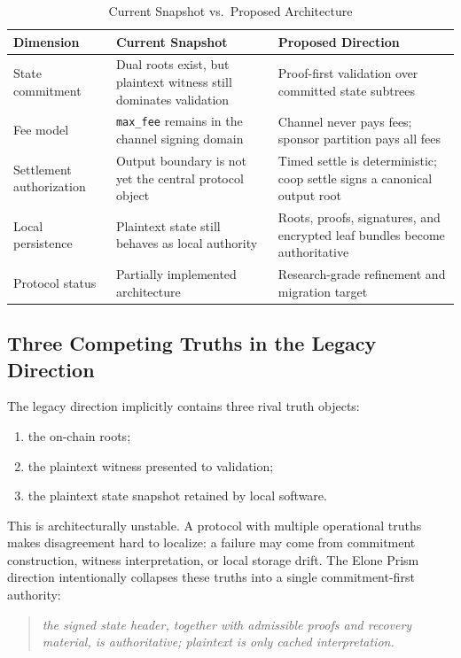 \documentclass[11pt,a4paper]{article}
\newcommand{\code}[1]{\texttt{#1}}
\begin{document}
\begin{table}[htbp]
\centering
\caption{Current Snapshot vs.\ Proposed Architecture}
\label{tab:current_vs_proposed}
\small
\begin{tabularx}{\linewidth}{@{}l X X@{}}
\toprule
\textbf{Dimension} & \textbf{Current Snapshot} & \textbf{Proposed Direction} \\
\midrule
State commitment & Dual roots exist, but plaintext witness still dominates validation & Proof-first validation over committed state subtrees \\
Fee model & \code{max\_fee} remains in the channel signing domain & Channel never pays fees; sponsor partition pays all fees \\
Settlement authorization & Output boundary is not yet the central protocol object & Timed settle is deterministic; coop settle signs a canonical output root \\
Local persistence & Plaintext state still behaves as local authority & Roots, proofs, signatures, and encrypted leaf bundles become authoritative \\
Protocol status & Partially implemented architecture & Research-grade refinement and migration target \\
\bottomrule
\end{tabularx}
\end{table}

\subsection{Three Competing Truths in the Legacy Direction}

The legacy direction implicitly contains three rival truth objects:
\begin{enumerate}
    \item the on-chain roots;
    \item the plaintext witness presented to validation;
    \item the plaintext state snapshot retained by local software.
\end{enumerate}

This is architecturally unstable. A protocol with multiple operational truths makes disagreement hard to localize: a failure may come from commitment construction, witness interpretation, or local storage drift. The Elone Prism direction intentionally collapses these truths into a single commitment-first authority:
\begin{quote}
\textit{the signed state header, together with admissible proofs and recovery material, is authoritative; plaintext is only cached interpretation.}
\end{quote}
\end{document}

